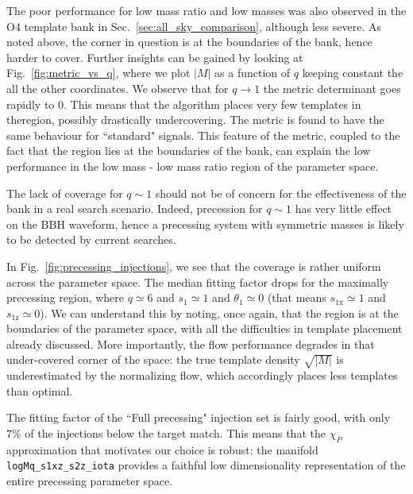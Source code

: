 \documentclass[twocolumn,showpacs,preprintnumbers,nofootinbib,prd,
superscriptaddress,10pt]{revtex4-2}
\begin{document}
The poor performance for low mass ratio and low masses was also observed in the O4 template bank in Sec.~\ref{sec:all_sky_comparison}, although less severe. As noted above, the corner in question is at the boundaries of the bank, hence harder to cover.
Further insights can be gained by looking at Fig.~\ref{fig:metric_vs_q}, where we plot $|M|$ as a function of $q$ keeping constant the all the other coordinates. We observe that for $q \to 1$ the metric determinant goes rapidly to $0$. This means that the algorithm places very few templates in theregion, possibly drastically undercovering.
The metric is found to have the same behaviour for ``standard" signals.
This feature of the metric, coupled to the fact that the region lies at the boundaries of the bank, can explain the low performance in the low mass - low mass ratio region of the parameter space.

The lack of coverage for $q\sim 1$ should not be of concern for the effectiveness of the bank in a real search scenario. Indeed, precession for $q\sim 1$ has very little effect on the BBH waveform, hence a precessing system with symmetric masses is likely to be detected by current searches.

In Fig.~\ref{fig:precessing_injections}, we see that the coverage is rather uniform across the parameter space. The median fitting factor drops for the maximally precessing region, where $q \simeq 6$ and $s_1 \simeq 1$ and $\theta_1 \simeq 0$ (that means $s_\text{1x} \simeq 1$ and $s_\text{1z} \simeq 0$).
We can understand this by noting, once again, that the region is at the boundaries of the parameter space, with all the difficulties in template placement already discussed. More importantly, the flow performance degrades in that under-covered corner of the space: the true template density $\sqrt{|M|}$ is underestimated by the normalizing flow, which accordingly places less templates than optimal.

The fitting factor of the ``Full precessing" injection set is fairly good, with only $7\%$ of the injections below the target match. This means that the $\chi_P$ approximation that motivates our choice is robust: the manifold \texttt{logMq\_s1xz\_s2z\_iota} provides a faithful low dimensionality representation of the entire precessing parameter space.
\end{document}

